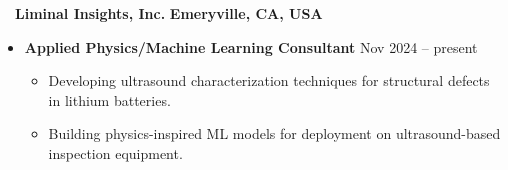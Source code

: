 ~~{\color{black}\textbf{Liminal Insights, Inc.} \hfill  \textbf{Emeryville, CA, USA}}\par
\begin{itemize}
    \item
        \textbf{Applied Physics/Machine Learning Consultant}
        \hfill  {Nov 2024 -- present} \par
        \begin{itemize}
            \item Developing ultrasound characterization techniques for structural defects in lithium batteries. 
            \item Building physics-inspired ML models for deployment on ultrasound-based inspection equipment.
        \end{itemize}
\end{itemize}